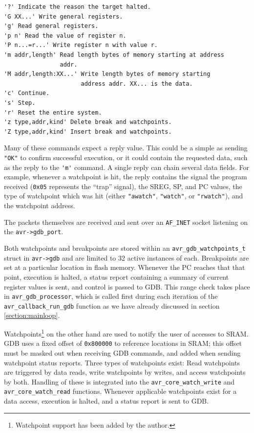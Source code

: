 \begin{Verbatim}[samepage=true]
'?' Indicate the reason the target halted.
'G XX...' Write general registers.
'g' Read general registers.
'p n' Read the value of register n.
'P n...=r...' Write register n with value r.
'm addr,length' Read length bytes of memory starting at address
                addr.
'M addr,length:XX...' Write length bytes of memory starting
                      address addr. XX... is the data.
'c' Continue.
's' Step.
'r' Reset the entire system.
'z type,addr,kind' Delete break and watchpoints.
'Z type,addr,kind' Insert break and watchpoints.
\end{Verbatim}

Many of these commands expect a reply value. This could be a simple as sending
\verb|"OK"| to confirm successful execution, or it could contain the requested
data, such as the reply to the \verb|'m'| command. A single reply can chain
several data fields. For example, whenever a watchpoint is hit, the reply contains
the signal the program received (\lstinline|0x05| represents the ``trap'' signal),
the \ac{SREG}, \ac{SP}, and \ac{PC} values, the type of watchpoint which was hit
(either \verb|"awatch"|, \verb|"watch"|, or \verb|"rwatch"|), and the watchpoint
address.

The packets themselves are received and sent over an \lstinline|AF_INET| socket listening
on the \lstinline|avr->gdb_port|.

Both watchpoints and breakpoints are stored within an \lstinline|avr_gdb_watchpoints_t|
struct in \lstinline|avr->gdb| and are limited to 32 active instances of each.
Breakpoints are set at a particular location in flash memory. Whenever the \ac{PC}
reaches that that point, execution is halted, a status report containing a summary
of current register values is sent, and control is passed to \ac{GDB}. This
range check takes place in \lstinline|avr_gdb_processor|, which is called
first during each iteration of the \lstinline|avr_callback_run_gdb| function
as we have already discussed in section \ref{section:mainloop}.

Watchpoints\footnote{Watchpoint support has been added by the author.}
on the other hand are used to notify the user of accesses to \ac{SRAM}.
\ac{GDB} uses a fixed offset of \lstinline|0x800000| to reference locations in
\ac{SRAM}; this offset must be masked out when receiving \ac{GDB} commands, and
added when sending watchpoint status reports.
Three types of watchpoints exist: Read watchpoints are triggered by data reads,
write watchpoints by writes, and access watchpoints by both. Handling of these
is integrated into the \lstinline|avr_core_watch_write| and
\lstinline|avr_core_watch_read| functions. Whenever applicable watchpoints exist
for a data access, execution is halted, and a status report is sent to \ac{GDB}.

